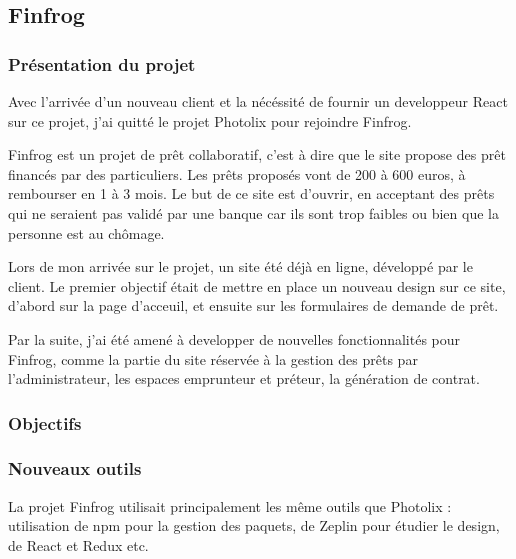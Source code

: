 \documentclass[12pt,a4paper]{article}
\begin{document}
  \subsection{Finfrog}\label{finfrog}

  \subsubsection{Présentation du
  projet}\label{pruxe9sentation-du-projet-1}

  \bigskip

  Avec l'arrivée d'un nouveau client et la nécéssité de fournir un
  developpeur React sur ce projet, j'ai quitté le projet Photolix pour
  rejoindre Finfrog.

  \bigskip

  Finfrog est un projet de prêt collaboratif, c'est à dire que le site
  propose des prêt financés par des particuliers. Les prêts proposés vont
  de 200 à 600 euros, à rembourser en 1 à 3 mois. Le but de ce site est
  d'ouvrir, en acceptant des prêts qui ne seraient pas validé par une
  banque car ils sont trop faibles ou bien que la personne est au chômage.

  \bigskip

  Lors de mon arrivée sur le projet, un site été déjà en ligne, développé
  par le client. Le premier objectif était de mettre en place un nouveau
  design sur ce site, d'abord sur la page d'acceuil, et ensuite sur les
  formulaires de demande de prêt.

  \bigskip

  Par la suite, j'ai été amené à developper de nouvelles fonctionnalités
  pour Finfrog, comme la partie du site réservée à la gestion des prêts
  par l'administrateur, les espaces emprunteur et préteur, la génération
  de contrat.

  \subsubsection{Objectifs}\label{objectifs-1}

  \subsubsection{Nouveaux outils}\label{nouveaux-outils}

  \bigskip

  La projet Finfrog utilisait principalement les même outils que Photolix
  : utilisation de npm pour la gestion des paquets, de Zeplin pour étudier
  le design, de React et Redux etc.
\end{document}

